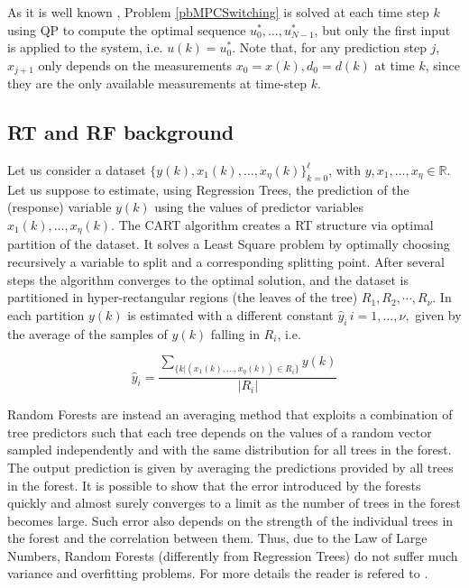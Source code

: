 \noindent As it is well known \cite{borrelli2017predictive}, Problem \ref{pbMPCSwitching} is solved at each time step $k$ using QP to compute the optimal sequence $u^*_0,\ldots,u^*_{N-1}$, but only the first input is applied to the system, i.e. $u(k) = u^*_0$. Note that, for any prediction step $j$, $x_{j+1}$ only depends on the measurements $x_0=x(k),d_0=d(k)$ at time $k$, since they are the only available measurements at time-step $k$. 

\subsection{RT and RF background}
Let us consider a dataset $\{y(k),x_1(k),\ldots,x_\eta(k)\}_{k=0}^\ell$, with $y,x_1,\ldots,x_\eta\in\mathbb{R}$. Let us suppose  to estimate, using Regression Trees, the prediction of the (response) variable $y(k)$ using the values of predictor variables $x_1(k),\ldots,x_\eta(k)$. The CART algorithm \cite{BreimanCART2017} creates a RT structure via optimal partition of the dataset. It solves a Least Square problem by optimally choosing recursively a variable to split and a corresponding splitting point. After several steps the algorithm converges to the optimal solution, and the dataset is partitioned in hyper-rectangular regions (the leaves of the tree) $R_1, R_2,\cdots, R_\nu$. In each partition $y(k)$ is estimated with a different constant $\hat y_i\, i=1,\ldots,\nu,$ given by the average of the samples of $y(k)$ falling in $R_i$, i.e.

\begin{equation}\label{eqAverageResponseRT}
\hat y_{i} = \frac{\sum\limits_{\{k|(x_1(k),\ldots, x_\eta(k)) \in R_i\}}y(k)}{|R_i|}
\end{equation}


\noindent Random Forests \cite{BreimanML2001} are instead an averaging method that exploits a combination of tree predictors such that each tree depends on the values of a random vector sampled independently and with the same distribution for all trees in the forest. The output prediction is given by averaging the predictions provided by all trees in the forest. It is possible to show that the error introduced by the forests quickly and almost surely converges to a limit as the number of trees in the forest becomes large. Such error also depends on the strength of the individual trees in the forest and the correlation between them. Thus, due to the Law of Large Numbers, Random Forests (differently from Regression Trees) do not suffer much variance and overfitting problems. For more details the reader is refered to \cite{BreimanCART2017,BreimanML2001}.


